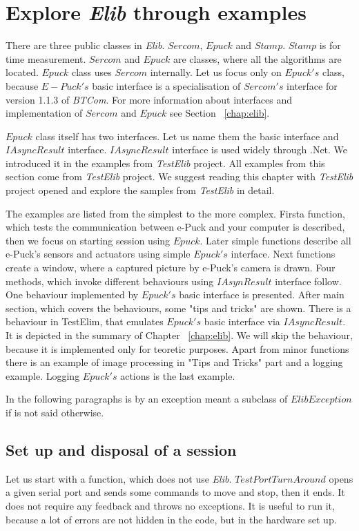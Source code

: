 \documentclass[12pt,notitlepage]{report}
\begin{document}
\section{Explore {\it Elib} through examples} \label{sec:interfaces}
	There are three public classes in {\it Elib}. $Sercom$, $Epuck$ and $Stamp$.
	$Stamp$ is for time measurement. $Sercom$ and $Epuck$ are classes, where all the algorithms are located.
	$Epuck$ class uses $Sercom$ internally.
	Let us focus only on $Epuck's$ class, because $E-Puck's$ basic interface is a specialisation of $Sercom's$
	interface for version 1.1.3 of {\it BTCom}.
	For more information about interfaces and implementation of $Sercom$ and $Epuck$ see Section ~\ref{chap:elib}.

	$Epuck$ class itself has two interfaces. Let us name them the basic interface and $IAsyncResult$ interface.
	$IAsyncResult$ interface is used widely through .Net. We introduced it in the examples from {\it TestElib} project.
	All examples from this section come from {\it TestElib} project. We suggest reading this chapter with {\it TestElib} project opened
	and explore the samples from {\it TestElib} in detail.

	The examples are listed from the simplest to the more complex. 
	Firsta function, which tests the communication between e-Puck and your computer is described,
	then we focus on starting session using $Epuck$.
	Later simple functions describe all e-Puck's sensors and actuators using simple $Epuck's$ interface.
	Next functions create a window, where a captured picture by e-Puck's camera is drawn.
	Four methods, which invoke different behaviours using $IAsynResult$ interface follow.
	One behaviour implemented by $Epuck's$ basic interface is presented.
	After main section, which covers the behaviours, some "tips and tricks" are shown.
	There is a behaviour in TestElim, that emulates $Epuck's$ basic interface via $IAsyncResult$. 
	It is depicted in the summary of Chapter ~\ref{chap:elib}.
	We will skip the behaviour, because it is implemented only for teoretic purposes.
	Apart from minor functions there is an example of image processing in "Tips and Tricks" part and a logging example.
	Logging $Epuck's$ actions is the last example.

	In the following paragraphs is by an exception meant a subclass of $ElibException$ if is not said otherwise.
\subsection{Set up and disposal of a session}\label{sec:session}
	Let us start with a function, which does not use {\it Elib}. $TestPortTurnAround$ opens a given serial port
	and sends some commands to move and stop, then it ends. It does not require any feedback and throws no exceptions.
	It is useful to run it, because a lot of errors are not hidden in the code, but in the hardware set up.
\end{document}

